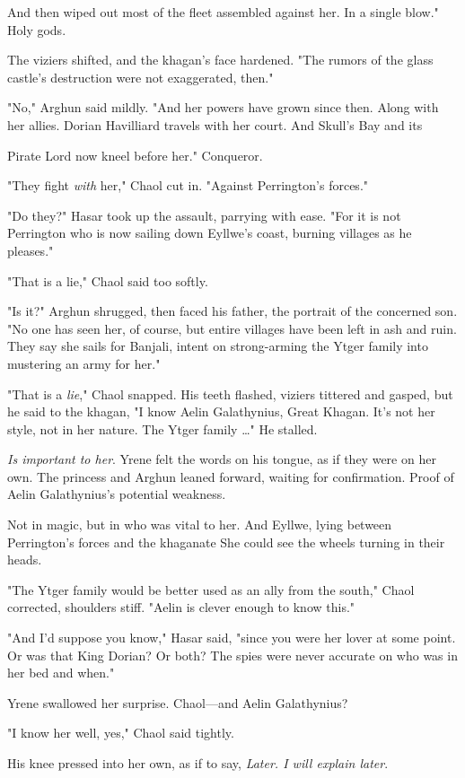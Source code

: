 And then wiped out most of the fleet assembled against her. In a single blow." Holy gods.

The viziers shifted, and the khagan's face hardened. "The rumors of the glass castle's destruction were not exaggerated, then."

"No," Arghun said mildly. "And her powers have grown since then. Along with her allies. Dorian Havilliard travels with her court. And Skull's Bay and its

Pirate Lord now kneel before her." Conqueror.

"They fight \emph{with} her," Chaol cut in. "Against Perrington's forces."

"Do they?" Hasar took up the assault, parrying with ease. "For it is not Perrington who is now sailing down Eyllwe's coast, burning villages as he pleases."

"That is a lie," Chaol said too softly.

"Is it?" Arghun shrugged, then faced his father, the portrait of the concerned son. "No one has seen her, of course, but entire villages have been left in ash and ruin. They say she sails for Banjali, intent on strong-arming the Ytger family into mustering an army for her."

"That is a \emph{lie}," Chaol snapped. His teeth flashed, viziers tittered and gasped, but he said to the khagan, "I know Aelin Galathynius, Great Khagan. It's not her style, not in her nature. The Ytger family \ldots" He stalled.

\emph{Is important to her}. Yrene felt the words on his tongue, as if they were on her own. The princess and Arghun leaned forward, waiting for confirmation. Proof of Aelin Galathynius's potential weakness.

Not in magic, but in who was vital to her. And Eyllwe, lying between Perrington's forces and the khaganate  She could see the wheels turning in their heads.

"The Ytger family would be better used as an ally from the south," Chaol corrected, shoulders stiff. "Aelin is clever enough to know this."

"And I'd suppose you know," Hasar said, "since you were her lover at some point. Or was that King Dorian? Or both? The spies were never accurate on who was in her bed and when."

Yrene swallowed her surprise. Chaol---and Aelin Galathynius?

"I know her well, yes," Chaol said tightly.

His knee pressed into her own, as if to say, \emph{Later. I will explain later}.

